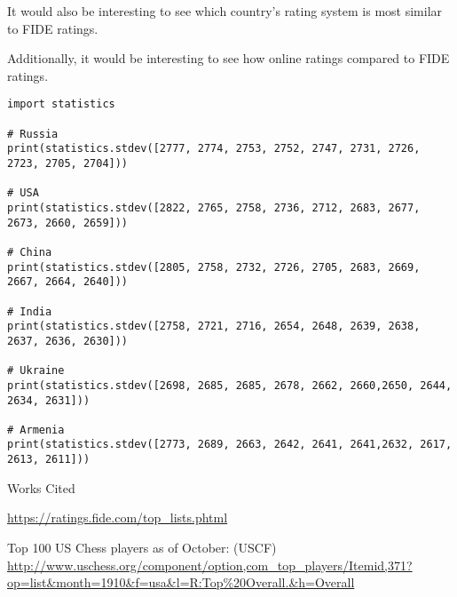 \documentclass[12pt]{article}
\begin{document}
It would also be interesting to see which country's rating system is most similar to FIDE ratings.

Additionally, it would be interesting to see how online ratings compared to FIDE ratings.

\newpage
\begin{verbatim}
import statistics

# Russia
print(statistics.stdev([2777, 2774, 2753, 2752, 2747, 2731, 2726, 2723, 2705, 2704]))

# USA
print(statistics.stdev([2822, 2765, 2758, 2736, 2712, 2683, 2677, 2673, 2660, 2659]))

# China
print(statistics.stdev([2805, 2758, 2732, 2726, 2705, 2683, 2669, 2667, 2664, 2640]))

# India 
print(statistics.stdev([2758, 2721, 2716, 2654, 2648, 2639, 2638, 2637, 2636, 2630])) 

# Ukraine
print(statistics.stdev([2698, 2685, 2685, 2678, 2662, 2660,2650, 2644, 2634, 2631]))

# Armenia
print(statistics.stdev([2773, 2689, 2663, 2642, 2641, 2641,2632, 2617, 2613, 2611]))
\end{verbatim}
\newpage
\begin{center}
Works Cited
\end{center}


\url{https://ratings.fide.com/top_lists.phtml}


Top 100 US Chess players as of October: (USCF)
\url{http://www.uschess.org/component/option,com_top_players/Itemid,371?op=list&month=1910&f=usa&l=R:Top%20Overall.&h=Overall}
\end{document}

